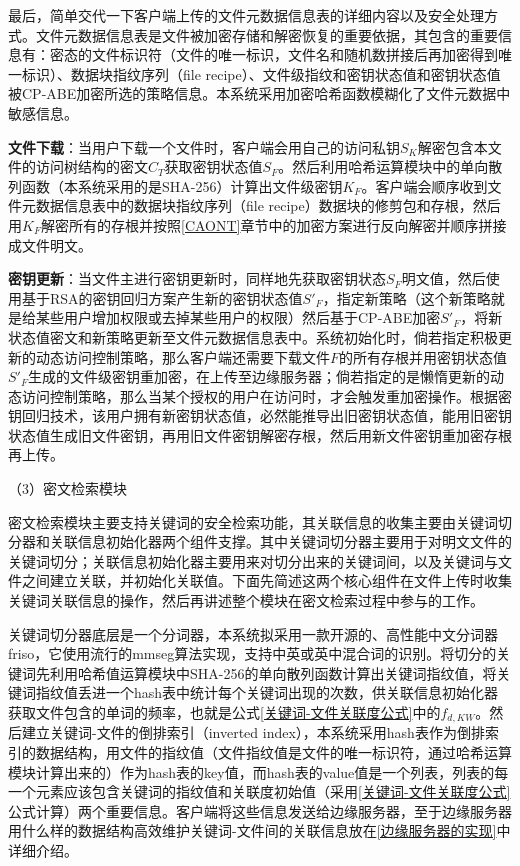\documentclass[promaster]{thesis-uestc}
\begin{document}
最后，简单交代一下客户端上传的文件元数据信息表的详细内容以及安全处理方式。文件元数据信息表是文件被加密存储和解密恢复的重要依据，其包含的重要信息有：密态的文件标识符（文件的唯一标识，文件名和随机数拼接后再加密得到唯一标识）、数据块指纹序列（file recipe）、文件级指纹和密钥状态值和密钥状态值被CP-ABE加密所选的策略信息。本系统采用加密哈希函数模糊化了文件元数据中敏感信息。

\textbf{文件下载}：当用户下载一个文件时，客户端会用自己的访问私钥$S_K$解密包含本文件的访问树结构的密文$C_T$获取密钥状态值$S_F$。然后利用哈希运算模块中的单向散列函数（本系统采用的是SHA-256）计算出文件级密钥$K_F$。客户端会顺序收到文件元数据信息表中的数据块指纹序列（file recipe）数据块的修剪包和存根，然后用$K_F$解密所有的存根并按照\ref{CAONT}章节中的加密方案进行反向解密并顺序拼接成文件明文。

\textbf{密钥更新}：当文件主进行密钥更新时，同样地先获取密钥状态$S_F$明文值，然后使用基于RSA的密钥回归方案产生新的密钥状态值$S'_F$，指定新策略（这个新策略就是给某些用户增加权限或去掉某些用户的权限）然后基于CP-ABE加密$S'_F$，将新状态值密文和新策略更新至文件元数据信息表中。系统初始化时，倘若指定积极更新的动态访问控制策略，那么客户端还需要下载文件$F$的所有存根并用密钥状态值$S'_F$生成的文件级密钥重加密，在上传至边缘服务器；倘若指定的是懒惰更新的动态访问控制策略，那么当某个授权的用户在访问时，才会触发重加密操作。根据密钥回归技术，该用户拥有新密钥状态值，必然能推导出旧密钥状态值，能用旧密钥状态值生成旧文件密钥，再用旧文件密钥解密存根，然后用新文件密钥重加密存根再上传。


（3）密文检索模块

密文检索模块主要支持关键词的安全检索功能，其关联信息的收集主要由关键词切分器和关联信息初始化器两个组件支撑。其中关键词切分器主要用于对明文文件的关键词切分；关联信息初始化器主要用来对切分出来的关键词间，以及关键词与文件之间建立关联，并初始化关联值。下面先简述这两个核心组件在文件上传时收集关键词关联信息的操作，然后再讲述整个模块在密文检索过程中参与的工作。

关键词切分器底层是一个分词器，本系统拟采用一款开源的、高性能中文分词器friso，它使用流行的mmseg算法实现，支持中英或英中混合词的识别。将切分的关键词先利用哈希值运算模块中SHA-256的单向散列函数计算出关键词指纹值，将关键词指纹值丢进一个hash表中统计每个关键词出现的次数，供关联信息初始化器获取文件包含的单词的频率，也就是公式\ref{关键词-文件关联度公式}中的$f_{d, KW}$。然后建立关键词-文件的倒排索引（inverted index），本系统采用hash表作为倒排索引的数据结构，用文件的指纹值（文件指纹值是文件的唯一标识符，通过哈希运算模块计算出来的）作为hash表的key值，而hash表的value值是一个列表，列表的每一个元素应该包含关键词的指纹值和关联度初始值（采用\ref{关键词-文件关联度公式}公式计算）两个重要信息。客户端将这些信息发送给边缘服务器，至于边缘服务器用什么样的数据结构高效维护关键词-文件间的关联信息放在\ref{边缘服务器的实现}中详细介绍。
\end{document}
